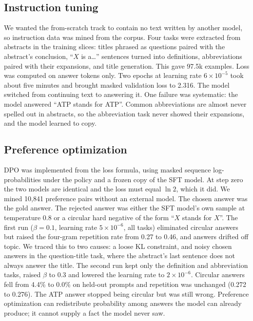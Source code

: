 \documentclass[11pt]{article}
\begin{document}
\subsection{Instruction tuning}
We wanted the from-scratch track to contain no text written by another
model, so instruction data was mined from the corpus. Four tasks were
extracted from abstracts in the training slices: titles phrased as questions
paired with the abstract's conclusion, ``$X$ is a\dots'' sentences turned
into definitions, abbreviations paired with their expansions, and title
generation. This gave 97.5k examples. Loss was computed on answer tokens
only. Two epochs at learning rate $6\times10^{-5}$ took about five minutes
and brought masked validation loss to 2.316. The model switched from
continuing text to answering it. One
failure was systematic: the model answered ``ATP stands for ATP''. Common
abbreviations are almost never spelled out in abstracts, so the
abbreviation task never showed their expansions, and the model learned to
copy.

\subsection{Preference optimization}
DPO \citep{rafailov2023direct} was implemented from the loss formula, using
masked sequence log-probabilities under the policy and a frozen copy of the
SFT model. At step zero the two models are identical and the loss must
equal $\ln 2$, which it did. We mined 10,841 preference pairs without an external model.
The chosen answer was the gold answer. The rejected answer was either the SFT
model's own sample at temperature 0.8 or a circular hard negative of the
form ``$X$ stands for $X$''. The first run ($\beta=0.1$, learning rate
$5\times10^{-6}$, all tasks) eliminated circular answers but raised the
four-gram repetition rate from 0.27 to 0.46, and answers drifted off topic. We traced
this to two causes: a loose KL constraint, and noisy chosen answers in the
question-title task, where the abstract's last sentence does not always
answer the title. The second run kept only the definition and abbreviation
tasks, raised $\beta$ to 0.3 and lowered the learning rate to
$2\times10^{-6}$. Circular answers fell from 4.4\% to 0.0\% on held-out
prompts and repetition was unchanged (0.272 to 0.276). The ATP answer
stopped being circular but was still wrong. Preference optimization can
redistribute probability among answers the model can already produce; it cannot supply a fact the
model never saw.
\end{document}
